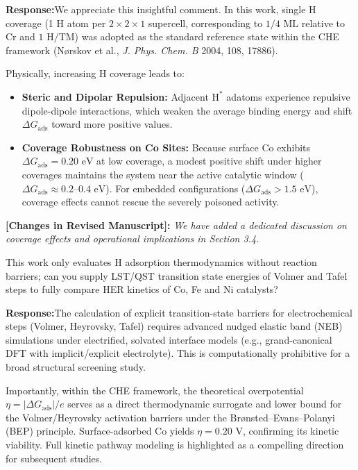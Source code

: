 \documentclass[11pt, sans, a4paper]{moderncv}
\newcommand{\response}{\vspace{0.4em}\noindent\textbf{\color{actionblue}Response:}\hspace{0.5em}}
\newcommand{\manuscriptchange}[1]{\vspace{0.3em}\noindent\textbf{\color{acsblue}[Changes in Revised Manuscript]:} \textit{#1}\vspace{0.4em}}
\begin{document}
\response We appreciate this insightful comment. In this work, single H coverage (1 H atom per $2\times 2\times 1$ supercell, corresponding to $1/4\text{ ML}$ relative to Cr and $1\text{ H}/\text{TM}$) was adopted as the standard reference state within the CHE framework (N{\o}rskov et al., \textit{J. Phys. Chem. B} 2004, 108, 17886). 

Physically, increasing H coverage leads to:
\begin{itemize}[leftmargin=1.5em, itemsep=0.2em]
    \item \textbf{Steric and Dipolar Repulsion:} Adjacent $\text{H}^*$ adatoms experience repulsive dipole-dipole interactions, which weaken the average binding energy and shift $\Delta G_{\mathrm{ads}}$ toward more positive values.
    \item \textbf{Coverage Robustness on Co Sites:} Because surface Co exhibits $\Delta G_{\mathrm{ads}} = 0.20\text{ eV}$ at low coverage, a modest positive shift under higher coverages maintains the system near the active catalytic window ($\Delta G_{\mathrm{ads}} \approx 0.2\text{--}0.4\text{ eV}$). For embedded configurations ($\Delta G_{\mathrm{ads}} > 1.5\text{ eV}$), coverage effects cannot rescue the severely poisoned activity.
\end{itemize}

\manuscriptchange{We have added a dedicated discussion on coverage effects and operational implications in Section 3.4.}

\begin{reviewercomment}
This work only evaluates H adsorption thermodynamics without reaction barriers; can you supply LST/QST transition state energies of Volmer and Tafel steps to fully compare HER kinetics of Co, Fe and Ni catalysts?
\end{reviewercomment}

\response The calculation of explicit transition-state barriers for electrochemical steps (Volmer, Heyrovsky, Tafel) requires advanced nudged elastic band (NEB) simulations under electrified, solvated interface models (e.g., grand-canonical DFT with implicit/explicit electrolyte). This is computationally prohibitive for a broad structural screening study.

Importantly, within the CHE framework, the theoretical overpotential $\eta = |\Delta G_{\mathrm{ads}}|/e$ serves as a direct thermodynamic surrogate and lower bound for the Volmer/Heyrovsky activation barriers under the Br{\o}nsted--Evans--Polanyi (BEP) principle. Surface-adsorbed Co yields $\eta = 0.20\text{ V}$, confirming its kinetic viability. Full kinetic pathway modeling is highlighted as a compelling direction for subsequent studies.
\end{document}
